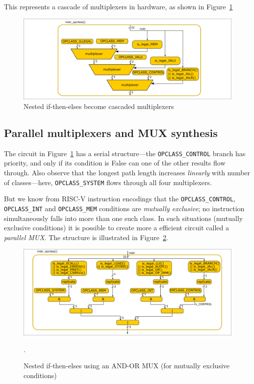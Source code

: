 This represents a cascade of multiplexers in hardware, as shown in
Figure~\ref{Fig_Combo_Multiplexer_Cascade}
\begin{figure}[htbp]
  \centerline{\includegraphics[width=6in,angle=0]{Figures/Fig_Combo_Multiplexer_Cascade}}
  \caption{\label{Fig_Combo_Multiplexer_Cascade}Nested if-then-elses become cascaded multiplexers}
\end{figure}


\subsection{Parallel multiplexers and MUX synthesis}

\label{Sec_MUXes}


The circuit in Figure~\ref{Fig_Combo_Multiplexer_Cascade} has a serial
structure---the \verb|OPCLASS_CONTROL| branch has priority, and only
if its condition is False can one of the other results flow through.
Also observe that the longest path length increases \emph{linearly}
with number of classes---here, \verb|OPCLASS_SYSTEM| flows through all
four multiplexers.

But we know from RISC-V instruction encodings that the
\verb|OPCLASS_CONTROL|, \verb|OPCLASS_INT| and \verb|OPCLASS_MEM|
conditions are \emph{mutually exclusive}; no instruction
simultaneously falls into more than one such class.  In such
situations (mutually exclusive conditions) it is possible to create
more a efficient circuit called a \emph{parallel MUX}.  The structure
is illustrated in Figure~\ref{Fig_Combo_Multiplexer_Parallel}.
\begin{figure}[htbp]
  \centerline{\includegraphics[width=6in,angle=0]{Figures/Fig_Combo_Multiplexer_Parallel}}
  \caption{\label{Fig_Combo_Multiplexer_Parallel}
           Nested if-then-elses using an AND-OR MUX (for mutually exclusive conditions)}.
\end{figure}

